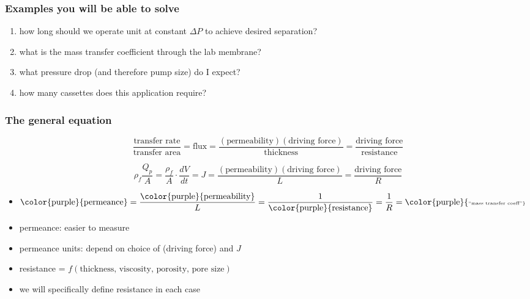 \begin{frame}\frametitle{Examples you will be able to solve}
	\begin{enumerate}
		\item	how long should we operate unit at constant \( \Delta P \) to achieve desired separation?
		\item	what is the mass transfer coefficient through the lab membrane?
		\item	what pressure drop (and therefore pump size) do I expect?
		\item	how many cassettes does this application require?
	\end{enumerate}
\end{frame}

\begin{frame}\frametitle{The general equation}
	\begin{exampleblock}{}
		\[
			\displaystyle \frac{\text{transfer rate}}{\text{transfer area}}  = \text{flux} = \displaystyle \frac{(\text{permeability})(\text{driving force})}{\text{thickness}} = \displaystyle \frac{\text{driving force}}{\text{resistance}}
		\]
	\end{exampleblock}

	
	\vfill
	{\color{myOrange}{Symbolically:}}
	\[
		\displaystyle \rho_f\frac{Q_p}{A} = \displaystyle\frac{\rho_f}{A}\cdot\frac{dV}{dt} =  J = \displaystyle \frac{(\text{permeability})(\text{driving force})}{L} = \displaystyle \frac{\text{driving force}}{R} 
	\]
	\begin{itemize}
		\item	 $\text{\color{purple}{permeance}} = \displaystyle \frac{\text{\color{purple}{permeability}}}{L} = \displaystyle \frac{1}{\text{\color{purple}{resistance}}} = \displaystyle \frac{1}{R} = \text{{\color{purple}{\tiny ``mass transfer coeff''}}}$
		\item	permeance: easier to measure
		\item	permeance units: depend on choice of (driving force) and $J$
		\item	resistance = $f(\text{thickness, viscosity, porosity, pore size})$
		\item	we will specifically define resistance in each case				
	\end{itemize}
	
\end{frame}

